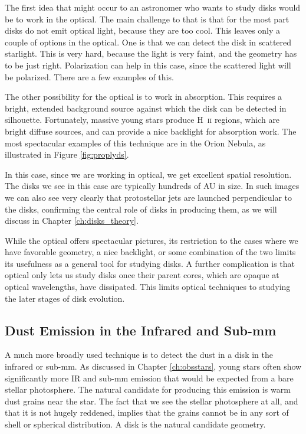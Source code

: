 The first idea that might occur to an astronomer who wants to study disks would be to work in the optical. The main challenge to that is that for the most part disks do not emit optical light, because they are too cool. This leaves only a couple of options in the optical. One is that we can detect the disk in scattered starlight. This is very hard, because the light is very faint, and the geometry has to be just right. Polarization can help in this case, since the scattered light will be polarized. There are a few examples of this.

The other possibility for the optical is to work in absorption. This requires a bright, extended background source against which the disk can be detected in silhouette. Fortunately, massive young stars produce H~\textsc{ii} regions, which are bright diffuse sources, and can provide a nice backlight for absorption work. The most spectacular examples of this technique are in the Orion Nebula, as illustrated in Figure \ref{fig:proplyds}.

In this case, since we are working in optical, we get excellent spatial resolution. The disks we see in this case are typically hundreds of AU in size. In such images we can also see very clearly that protostellar jets are launched perpendicular to the disks, confirming the central role of disks in producing them, as we will discuss in Chapter \ref{ch:disks_theory}.

While the optical offers spectacular pictures, its restriction to the cases where we have favorable geometry, a nice backlight, or some combination of the two limits its usefulness as a general tool for studying disks. A further complication is that optical only lets us study disks once their parent cores, which are opaque at optical wavelengths, have dissipated. This limits optical techniques to studying the later stages of disk evolution.


\subsection{Dust Emission in the Infrared and Sub-mm}

A much more broadly used technique is to detect the dust in a disk in the infrared or sub-mm. As discussed in Chapter \ref{ch:obsstars}, young stars often show significantly more IR and sub-mm emission that would be expected from a bare stellar photosphere. The natural candidate for producing this emission is warm dust grains near the star. The fact that we see the stellar photosphere at all, and that it is not hugely reddened, implies that the grains cannot be in any sort of shell or spherical distribution. A disk is the natural candidate geometry.

